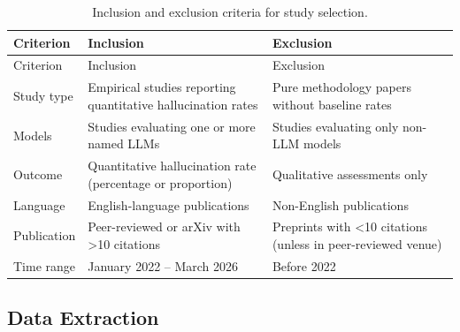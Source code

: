 \documentclass[
  11pt,
  a4paper,
]{article}
\begin{document}
\begin{longtable}[]{@{}
  >{\raggedright\arraybackslash}p{}
  >{\raggedright\arraybackslash}p{}
  >{\raggedright\arraybackslash}p{}@{}}
\caption{Inclusion and exclusion criteria for study
selection.}\label{tbl-criteria}\tabularnewline
\toprule\noalign{}
\begin{minipage}[b]{\linewidth}\raggedright
Criterion
\end{minipage} & \begin{minipage}[b]{\linewidth}\raggedright
Inclusion
\end{minipage} & \begin{minipage}[b]{\linewidth}\raggedright
Exclusion
\end{minipage} \\
\midrule\noalign{}
\endfirsthead
\toprule\noalign{}
\begin{minipage}[b]{\linewidth}\raggedright
Criterion
\end{minipage} & \begin{minipage}[b]{\linewidth}\raggedright
Inclusion
\end{minipage} & \begin{minipage}[b]{\linewidth}\raggedright
Exclusion
\end{minipage} \\
\midrule\noalign{}
\endhead
\bottomrule\noalign{}
\endlastfoot
Study type & Empirical studies reporting quantitative hallucination
rates & Pure methodology papers without baseline rates \\
Models & Studies evaluating one or more named LLMs & Studies evaluating
only non-LLM models \\
Outcome & Quantitative hallucination rate (percentage or proportion) &
Qualitative assessments only \\
Language & English-language publications & Non-English publications \\
Publication & Peer-reviewed or arXiv with \textgreater10 citations &
Preprints with \textless10 citations (unless in peer-reviewed venue) \\
Time range & January 2022 -- March 2026 & Before 2022 \\
\end{longtable}

\subsection{Data Extraction}\label{data-extraction}
\end{document}
